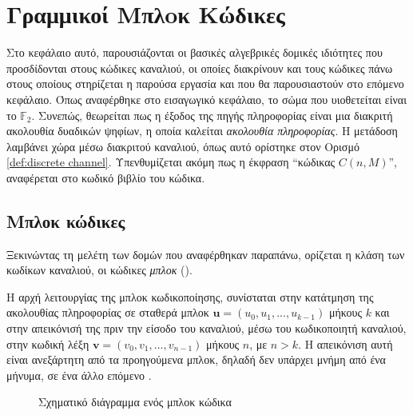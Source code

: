 \chapter{Γραμμικοί Μπλoκ Κώδικες}
Στο κεφάλαιο αυτό, παρουσιάζονται οι βασικές αλγεβρικές δομικές ιδιότητες που προσδίδονται στους κώδικες καναλιού, οι οποίες διακρίνουν και τους κώδικες πάνω στους οποίους στηρίζεται η παρούσα εργασία και που θα παρουσιαστούν στο επόμενο κεφάλαιο. Όπως αναφέρθηκε στο εισαγωγικό κεφάλαιο, το σώμα που υιοθετείται είναι το $\mathbb{F}_2$. Συνεπώς, θεωρείται πως η έξοδος της πηγής πληροφορίας είναι μια διακριτή ακολουθία  δυαδικών ψηφίων, η οποία καλείται \textit{ακολουθία πληροφορίας}. Η μετάδοση λαμβάνει χώρα μέσω διακριτού καναλιού, όπως αυτό ορίστηκε στον Ορισμό \ref{def:discrete channel}. Υπενθυμίζεται ακόμη πως η έκφραση \enquote{κώδικας $C(n,M)$}, αναφέρεται στο κωδικό βιβλίο του κώδικα.

\section{Μπλοκ κώδικες}
Ξεκινώντας τη μελέτη των δομών που αναφέρθηκαν παραπάνω, ορίζεται η κλάση των κωδίκων καναλιού, οι κώδικες \textit{μπλοκ} ().

Η αρχή λειτουργίας της μπλοκ κωδικοποίησης, συνίσταται στην κατάτμηση της ακολουθίας πληροφορίας σε σταθερά μπλοκ $\mathbf{u} = (u_0, u_1, ..., u_{k-1})$ μήκους $k$ και στην απεικόνισή της πριν την είσοδο του καναλιού, μέσω του κωδικοποιητή καναλιού, στην κωδική λέξη $\mathbf{v} = (v_0, v_1, ..., v_{n-1})$ μήκους $n$, με $n>k$. H απεικόνιση αυτή είναι ανεξάρτητη από τα προηγούμενα μπλοκ, δηλαδή δεν υπάρχει μνήμη από ένα μήνυμα, σε ένα άλλο επόμενο \cite{proakis1994communication}.

\begin{figure}[h]
\caption{Σχηματικό διάγραμμα ενός μπλοκ κώδικα}
\label{fig:linear block codes}
\end{figure}

